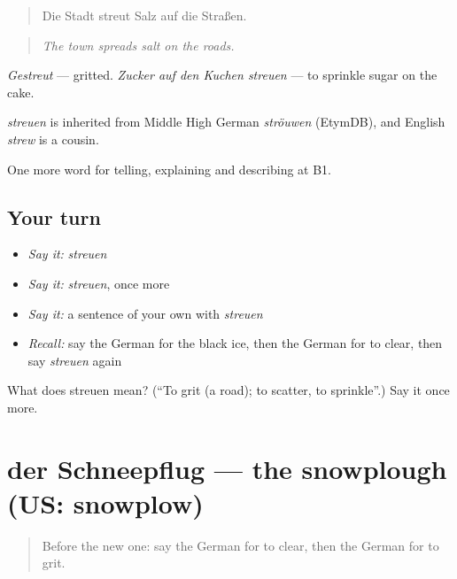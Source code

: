 \begin{quote}
Die Stadt streut Salz auf die Straßen.
\end{quote}

\begin{quote}
\emph{The town spreads salt on the roads.}
\end{quote}

\emph{Gestreut} — gritted. \emph{Zucker auf den Kuchen streuen} — to sprinkle sugar on the cake.

\begin{cousinweb}
\emph{streuen} is inherited from Middle High German \emph{ströuwen} (EtymDB), and English \emph{strew} is a cousin.
\end{cousinweb}

\begin{grammarlens}[title={What you've built}]
One more word for telling, explaining and describing at B1.
\end{grammarlens}

\subsection*{Your turn}
\begin{itemize}
\raggedright
  \item \emph{Say it:} \emph{streuen}
  \item \emph{Say it:} \emph{streuen}, once more
  \item \emph{Say it:} a sentence of your own with \emph{streuen}
  \item \emph{Recall:} say the German for the black ice, then the German for to clear, then say \emph{streuen} again
\end{itemize}

\begin{tcolorbox}[breakable,colback=teal!4,colframe=teal!35!black,title={Before you move on}]
What does streuen mean? (\textquotedblleft{}To grit (a road); to scatter, to sprinkle\textquotedblright{}.) Say it once more.
\end{tcolorbox}
\section[der Schneepflug]{der Schneepflug — the snowplough (US: snowplow)}

\label{lesson:GE-C442-schneepflug}



\begin{quote}
Before the new one: say the German for to clear, then the German for to grit.
\end{quote}

